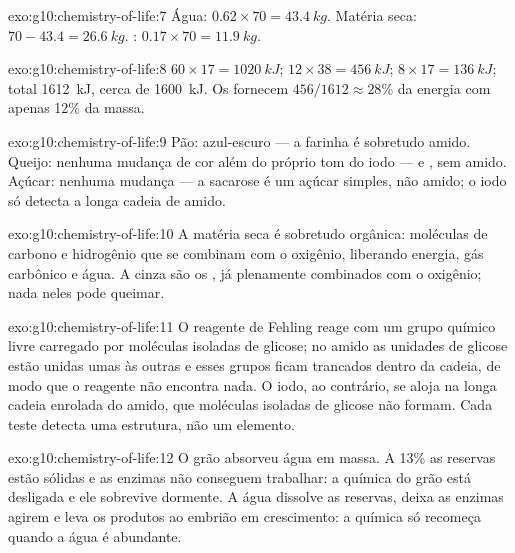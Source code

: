 \begin{solution}{exo:g10:chemistry-of-life:7}
Água: $0.62 \times 70 = \qty{43.4}{kg}$. Matéria seca: $70 - 43.4 =
\qty{26.6}{kg}$. : $0.17 \times 70 = \qty{11.9}{kg}$.
\end{solution}

\begin{solution}{exo:g10:chemistry-of-life:8}
 $60 \times 17 = \qty{1020}{kJ}$;  $12 \times 38 =
\qty{456}{kJ}$;  $8 \times 17 = \qty{136}{kJ}$; total
\qty{1612}{kJ}, cerca de \qty{1600}{kJ}. Os  fornecem $456/1612 \approx
28\%$ da energia com apenas 12\% da massa.
\end{solution}

\begin{solution}{exo:g10:chemistry-of-life:9}
Pão: azul-escuro --- a farinha é sobretudo amido. Queijo: nenhuma
mudança de cor além do próprio tom do iodo ---  e ,
sem amido. Açúcar: nenhuma mudança --- a sacarose é um açúcar simples,
não amido; o iodo só detecta a longa cadeia de amido.
\end{solution}

\begin{solution}{exo:g10:chemistry-of-life:10}
A matéria seca é sobretudo orgânica: moléculas de carbono e hidrogênio
que se combinam com o oxigênio, liberando energia, gás carbônico e
água. A cinza são os , já plenamente combinados com o
oxigênio; nada neles pode queimar.
\end{solution}

\begin{solution}{exo:g10:chemistry-of-life:11}
O reagente de Fehling reage com um grupo químico livre carregado por
moléculas isoladas de glicose; no amido as unidades de glicose estão
unidas umas às outras e esses grupos ficam trancados dentro da cadeia,
de modo que o reagente não encontra nada. O iodo, ao contrário, se
aloja na longa cadeia enrolada do amido, que moléculas isoladas de
glicose não formam. Cada teste detecta uma estrutura, não um elemento.
\end{solution}

\begin{solution}{exo:g10:chemistry-of-life:12}
O grão absorveu água em massa. A 13\% as reservas estão sólidas e as
enzimas não conseguem trabalhar: a química do grão está desligada e ele
sobrevive dormente. A água dissolve as reservas, deixa as enzimas
agirem e leva os produtos ao embrião em crescimento: a química só
recomeça quando a água é abundante.
\end{solution}

